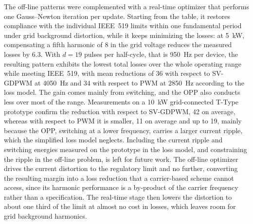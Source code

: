 \documentclass[conference]{IEEEtran}
\newcommand{\pct}{\text{\char`\%}}
\newcommand{\upd}[1]{\par\smallskip\noindent{\color{red}\footnotesize
    \textbf{[ACTUALIZAR]} #1}\par\smallskip}
\renewcommand{\upd}[1]{}       %
\newcommand{\old}[1]{\par\smallskip\noindent{\color{gray}\footnotesize
    \textbf{[ANTES]} #1}\par\smallskip}
\renewcommand{\old}[1]{}       %
\begin{document}
The off-line patterns were complemented with a real-time optimizer that
performs one Gauss--Newton iteration per update. Starting from the table, it
restores compliance with the individual IEEE~519 limits within one
fundamental period under grid background distortion, while it keeps minimizing the losses: at 5~kW, compensating a
fifth harmonic of 8\pct{} in the grid voltage reduces the measured losses
by 6.3\pct{}.
With $d = 19$ pulses per half-cycle, that is 950~Hz per device, the resulting
pattern exhibits the lowest total losses over the whole operating range while
meeting IEEE~519, with mean reductions of 36\pct{} with respect to SV-GDPWM at
4050~Hz and 34\pct{} with respect to PWM at 2850~Hz according to the loss
model. The gain comes mainly from switching, and the OPP also conducts less
over most of the range. Measurements on a 10~kW grid-connected T-Type
prototype confirm the reduction with respect to SV-GDPWM, 42\pct{} on average,
whereas with respect to PWM it is smaller, 11\pct{} on average and up to
19\pct{}, mainly because the OPP, switching at a lower frequency, carries a
larger current ripple, which the simplified loss model neglects. Including
the current ripple and switching energies measured on the prototype in the
loss model, and constraining the ripple in the off-line problem, is left
for future work. The
off-line optimizer drives the current distortion to the regulatory limit and
no further, converting the resulting margin into a loss reduction that a
carrier-based scheme cannot access, since its harmonic performance is a
by-product of the carrier frequency rather than a specification. The
real-time stage then lowers the distortion to about one third of the limit
at almost no cost in losses, which leaves room for grid background
harmonics.
\old{\dots\ confirm the reduction with respect to SV-GDPWM, 33\pct{} on
average, whereas with respect to PWM it is smaller, 8\pct{} on average and
up to 14\pct{}, since the measured losses include effects that the model
neglects, such as the current ripple, and these weigh most at light load.}
\old{The optimizer drives the current distortion to the regulatory limit and
no further, \dots}
\upd{Bibliografia: candidatas en \texttt{docs/REFERENCIAS.md}. La mas
importante es Rahmanpour, Karamanakos y Geyer, IEEE TIA 2025 (version revista
de \texttt{rahmanpour\_lcl}): OPP multipolar con LCL y limites armonicos de
red como restricciones, es decir, lo mas cercano al problema off-line; un
revisor la va a buscar. Se cita en el parrafo 3 de la introduccion y se
diferencia porque minimiza distorsion, no perdidas. Despues, las versiones
revista de Koukoula (TIA 2025 y TPEL 2025), que reemplazan a
\texttt{koukoula\_ecce23} y \texttt{koukoula\_junction}.}
\end{document}
